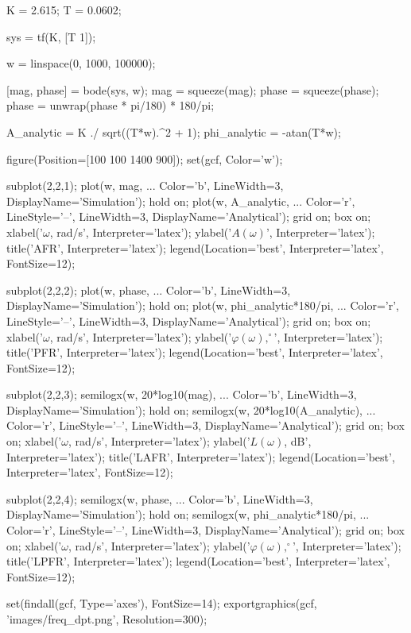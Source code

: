 \begin{matlabcode}
K = 2.615;
T = 0.0602;

sys = tf(K, [T 1]);

w = linspace(0, 1000, 100000);

[mag, phase] = bode(sys, w);
mag = squeeze(mag);
phase = squeeze(phase);
phase = unwrap(phase * pi/180) * 180/pi;

A_analytic = K ./ sqrt((T*w).^2 + 1);
phi_analytic = -atan(T*w);

figure(Position=[100 100 1400 900]);
set(gcf, Color='w');

subplot(2,2,1);
plot(w, mag, ...
    Color='b', LineWidth=3, DisplayName='Simulation');
hold on;
plot(w, A_analytic, ...
    Color='r', LineStyle='--', LineWidth=3, DisplayName='Analytical');
grid on; box on;
xlabel('$\omega$, rad/s', Interpreter='latex');
ylabel('$A(\omega)$', Interpreter='latex');
title('AFR', Interpreter='latex');
legend(Location='best', Interpreter='latex', FontSize=12);

subplot(2,2,2);
plot(w, phase, ...
    Color='b', LineWidth=3, DisplayName='Simulation');
hold on;
plot(w, phi_analytic*180/pi, ...
    Color='r', LineStyle='--', LineWidth=3, DisplayName='Analytical');
grid on; box on;
xlabel('$\omega$, rad/s', Interpreter='latex');
ylabel('$\varphi(\omega), ^\circ$', Interpreter='latex');
title('PFR', Interpreter='latex');
legend(Location='best', Interpreter='latex', FontSize=12);


subplot(2,2,3);
semilogx(w, 20*log10(mag), ...
    Color='b', LineWidth=3, DisplayName='Simulation');
hold on;
semilogx(w, 20*log10(A_analytic), ...
    Color='r', LineStyle='--', LineWidth=3, DisplayName='Analytical');
grid on; box on;
xlabel('$\omega$, rad/s', Interpreter='latex');
ylabel('$L(\omega)$, dB', Interpreter='latex');
title('LAFR', Interpreter='latex');
legend(Location='best', Interpreter='latex', FontSize=12);

subplot(2,2,4);
semilogx(w, phase, ...
    Color='b', LineWidth=3, DisplayName='Simulation');
hold on;
semilogx(w, phi_analytic*180/pi, ...
    Color='r', LineStyle='--', LineWidth=3, DisplayName='Analytical');
grid on; box on;
xlabel('$\omega$, rad/s', Interpreter='latex');
ylabel('$\varphi(\omega), ^\circ$', Interpreter='latex');
title('LPFR', Interpreter='latex');
legend(Location='best', Interpreter='latex', FontSize=12);

set(findall(gcf, Type='axes'), FontSize=14);
exportgraphics(gcf, 'images/freq_dpt.png', Resolution=300);
\end{matlabcode}


